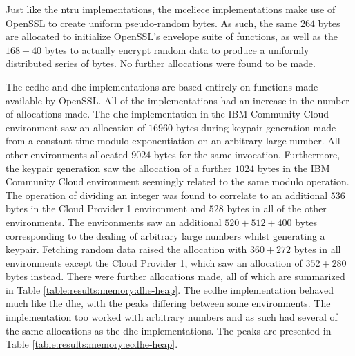 Just like the \gls{ntru} implementations, the \gls{mceliece} implementations make use of OpenSSL to create uniform pseudo-random bytes. As such, the same $264$ bytes are allocated to initialize OpenSSL's envelope suite of functions, as well as the $168 + 40$ bytes to actually encrypt random data to produce a uniformly distributed series of bytes. No further allocations were found to be made.

The \gls{ecdhe} and \gls{dhe} implementations are based entirely on functions made available by OpenSSL. All of the implementations had an increase in the number of allocations made. The \gls{dhe} implementation in the IBM Community Cloud environment saw an allocation of $16960$ bytes during keypair generation made from a constant-time modulo exponentiation on an arbitrary large number. All other environments allocated $9024$ bytes for the same invocation. Furthermore, the keypair generation saw the allocation of a further $1024$ bytes in the IBM Community Cloud environment seemingly related to the same modulo operation.
The operation of dividing an integer was found to correlate to an additional $536$ bytes in the Cloud Provider 1 environment and $528$ bytes in all of the other environments. The environments saw an additional $520 + 512 + 400$ bytes corresponding to the dealing of arbitrary large numbers whilst generating a keypair. Fetching random data raised the allocation with $360 + 272$ bytes in all environments except the Cloud Provider 1, which saw an allocation of $352 + 280$ bytes instead. There were further allocations made, all of which are summarized in Table \ref{table:results:memory:dhe-heap}. The \gls{ecdhe} implementation behaved much like the \gls{dhe}, with the peaks differing between some environments. The implementation too worked with arbitrary numbers and as such had several of the same allocations as the \gls{dhe} implementations. The peaks are presented in Table \ref{table:results:memory:ecdhe-heap}.


